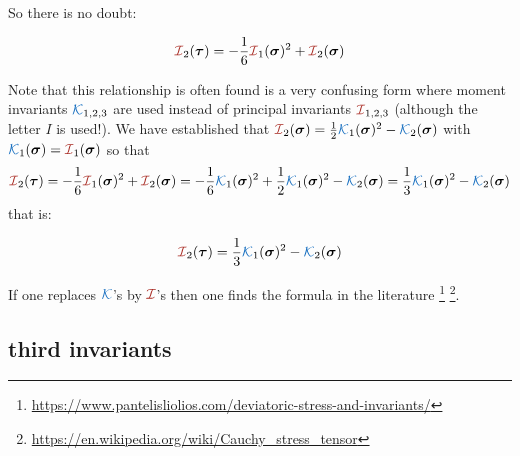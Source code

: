 So there is no doubt:
\begin{mdframed}[backgroundcolor=blue!5]
\[
{\III}_2(\bm\tau) =  -\frac16 {\III}_1(\bm\sigma)^2 + {\III}_2(\bm\sigma)
\]
\end{mdframed}
Note that this relationship is often found is a very confusing 
form where moment invariants ${\KKK}_{1,2,3}$ are used instead of 
principal invariants ${\III}_{1,2,3}$ (although the letter $I$ is used!). 
We have established that ${\III}_2(\bm\sigma)=\frac12 {\KKK}_1(\bm\sigma)^2-{\KKK}_2(\bm\sigma)$
with ${\KKK}_1(\bm\sigma)={\III}_1(\bm\sigma)$ so that 
\[
{\III}_2(\bm\tau) 
= -\frac16 {\III}_1(\bm\sigma)^2 + {\III}_2(\bm\sigma)
= -\frac16 {\KKK}_1(\bm\sigma)^2 + \frac12 {\KKK}_1(\bm\sigma)^2-{\KKK}_2(\bm\sigma) 
= \frac13 {\KKK}_1(\bm\sigma)^2 - {\KKK}_2(\bm\sigma)
\]
that is:
\begin{mdframed}[backgroundcolor=blue!5]
\[
{\III}_2(\bm\tau) =  
\frac13 {\KKK}_1(\bm\sigma)^2 - {\KKK}_2(\bm\sigma)
\]
\end{mdframed}


If one replaces ${\KKK}$'s by ${\III}$'s then one finds the formula in the literature 
\footnote{\url{https://www.pantelisliolios.com/deviatoric-stress-and-invariants/}}
\footnote{\url{https://en.wikipedia.org/wiki/Cauchy_stress_tensor}}.





\newpage
\subsection*{third invariants}


